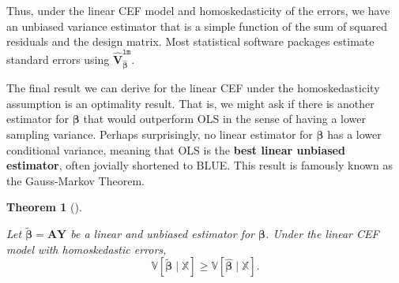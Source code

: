 \documentclass[
  13pt,
  letterpaper,
  DIV=11,
  numbers=noendperiod]{scrreprt}
\newcommand{\mb}{\symbf}
\newcommand{\V}{\mathbb{V}}
\newcommand{\Xmat}{\mathbb{X}}
\newcommand{\bfbeta}{\mb{\beta}}
\newcommand{\bhat}{\widehat{\mb{\beta}}}
\theoremstyle{plain}
\newtheorem{theorem}{Theorem}[chapter]
\theoremstyle{definition}
\theoremstyle{definition}
\theoremstyle{remark}
\begin{document}
Thus, under the linear CEF model and homoskedasticity of the errors, we
have an unbiased variance estimator that is a simple function of the sum
of squared residuals and the design matrix. Most statistical software
packages estimate standard errors using
\(\widehat{\mb{V}}^{\texttt{lm}}_{\bhat}\).

The final result we can derive for the linear CEF under the
homoskedasticity assumption is an optimality result. That is, we might
ask if there is another estimator for \(\bfbeta\) that would outperform
OLS in the sense of having a lower sampling variance. Perhaps
surprisingly, no linear estimator for \(\bfbeta\) has a lower
conditional variance, meaning that OLS is the \textbf{best linear
unbiased estimator}, often jovially shortened to BLUE. This result is
famously known as the Gauss-Markov Theorem.

\begin{theorem}[]\protect\hypertarget{thm-gauss-markov}{}\label{thm-gauss-markov}

Let \(\widetilde{\bfbeta} = \mb{AY}\) be a linear and unbiased estimator
for \(\bfbeta\). Under the linear CEF model with homoskedastic errors,
\[
\V[\widetilde{\bfbeta}\mid \Xmat] \geq \V[\bhat \mid \Xmat]. 
\]

\end{theorem}
\end{document}
